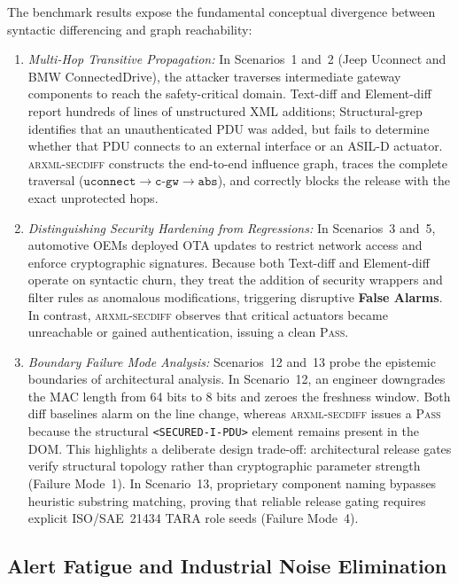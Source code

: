 \documentclass[journal]{IEEEtran}
\begin{document}
The benchmark results expose the fundamental conceptual divergence between syntactic differencing and graph reachability:
\begin{enumerate}
\item \emph{Multi-Hop Transitive Propagation:} In Scenarios~1 and~2 (Jeep Uconnect and BMW ConnectedDrive), the attacker traverses intermediate gateway components to reach the safety-critical domain. Text-diff and Element-diff report hundreds of lines of unstructured XML additions; Structural-grep identifies that an unauthenticated PDU was added, but fails to determine whether that PDU connects to an external interface or an ASIL-D actuator. \textsc{arxml-secdiff} constructs the end-to-end influence graph, traces the complete traversal ($\texttt{uconnect} \to \texttt{c-gw} \to \texttt{abs}$), and correctly blocks the release with the exact unprotected hops.

\item \emph{Distinguishing Security Hardening from Regressions:} In Scenarios~3 and~5, automotive OEMs deployed OTA updates to restrict network access and enforce cryptographic signatures. Because both Text-diff and Element-diff operate on syntactic churn, they treat the addition of security wrappers and filter rules as anomalous modifications, triggering disruptive \textbf{False Alarms}. In contrast, \textsc{arxml-secdiff} observes that critical actuators became unreachable or gained authentication, issuing a clean \textsc{Pass}.

\item \emph{Boundary Failure Mode Analysis:} Scenarios~12 and~13 probe the epistemic boundaries of architectural analysis. In Scenario~12, an engineer downgrades the MAC length from 64 bits to 8 bits and zeroes the freshness window. Both diff baselines alarm on the line change, whereas \textsc{arxml-secdiff} issues a \textsc{Pass} because the structural \texttt{<SECURED-I-PDU>} element remains present in the DOM. This highlights a deliberate design trade-off: architectural release gates verify structural topology rather than cryptographic parameter strength (Failure Mode~1). In Scenario~13, proprietary component naming bypasses heuristic substring matching, proving that reliable release gating requires explicit ISO/SAE~21434 TARA role seeds (Failure Mode~4).
\end{enumerate}

\subsection{Alert Fatigue and Industrial Noise Elimination}
\label{subsec:noise_reduction}
\end{document}
